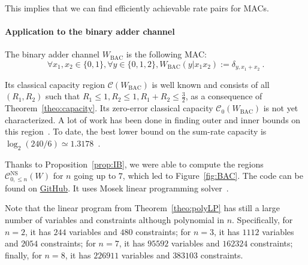 \documentclass[11pt]{article}
\theoremstyle{definition}
\theoremstyle{remark}
\begin{document}
This implies that we can find efficiently achievable rate pairs for MACs.

\paragraph{Application to the binary adder channel}
The binary adder channel $W_{\text{BAC}}$ is the following MAC:
\[ \forall x_1,x_2 \in \{0,1\}, \forall y \in \{0,1,2\}, W_{\text{BAC}}(y|x_1x_2) := \delta_{y,x_1+x_2} \ .\]

Its classical capacity region $\mathcal{C}(W_{\text{BAC}})$ is well known and consists of all $(R_1,R_2)$ such that $R_1 \leq 1,R_2 \leq 1, R_1+R_2 \leq \frac{3}{2}$, as a consequence of Theorem~\ref{theo:capacity}. Its zero-error classical capacity $\mathcal{C}_0(W_{\text{BAC}})$ is not yet characterized. A lot of work has been done in finding outer and inner bounds on this region~\cite{Lindstrom69,Tilborg78,KL78,Weldon78,KLWY83,BT85,BB98,UL98,AB99,MO05,OS15}. To date, the best lower bound on the sum-rate capacity is $\log_2(240/6) \simeq 1.3178$~\cite{MO05}.

Thanks to Proposition~\ref{prop:IB}, we were able to compute the regions $\mathcal{C}_{0,\leq n}^{\mathrm{NS}}(W)$ for $n$ going up to $7$, which led to Figure~\ref{fig:BAC}. The code can be found on \href{https://github.com/pferme/MAC_NS_LP}{GitHub}. It uses Mosek linear programming solver~\cite{mosek}.

Note that the linear program from Theorem~\ref{theo:polyLP} has still a large number of variables and constraints although polynomial in $n$. Specifically, for $n=2$, it has $244$ variables and $480$ constraints; for $n=3$, it has $1112$ variables and $2054$ constraints; for $n=7$, it has $95592$ variables and $162324$ constraints; finally, for $n=8$, it has $226911$ variables and $383103$ constraints.
\end{document}
